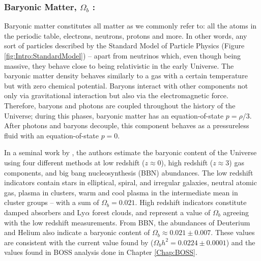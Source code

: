 \subsubsection{Baryonic Matter, $\Omega_b$ :}
Baryonic matter constitutes all matter as we commonly refer to: all the atoms in the periodic table, electrons, neutrons, protons and more. In other words, any sort of particles described by the Standard Model of Particle Physics (Figure \ref{fig:Intro:StandardModel}) -- apart from neutrinos which, even though being massive, they behave close to being relativistic in the early Universe. The baryonic matter density behaves similarly to a gas with a certain temperature but with zero chemical potential. Baryons interact with other components not only via gravitational interaction but also via the electromagnetic force. Therefore, baryons and photons are coupled throughout the history of the Universe; during this phases, baryonic matter has an equation-of-state $p = \rho/3$. After photons and baryons decouple, this component behaves as a pressureless fluid with an equation-of-state $p=0$. 

\qquad In a seminal work by \cite{1998BaryonContent}, the authors estimate the baryonic content of the Universe using four different methods at low redshift ($z \approx 0$), high redshift ($z\approx 3$) gas components, and big bang nucleosynthesis (BBN) abundances. The low redshift indicators contain stars in elliptical, spiral, and irregular galaxies, neutral atomic gas, plasma in clusters, warm and cool plasma in the intermediate mean in cluster groups -- with a sum of $\Omega_b = 0.021$. High redshift indicators constitute damped absorbers and Ly$\alpha$ forest clouds, and represent a value of $\Omega_b$ agreeing with the low redshift measurements. From BBN, the abundances of Deuterium and Helium also indicate a baryonic content of $\Omega_b \approx 0.021\pm 0.007$. These values are consistent with the current value found by \cite{2018PlanckCosmology} ($\Omega_b h^2 = 0.0224 \pm 0.0001$) and the values found in BOSS analysis done in Chapter \ref{Chap:BOSS}.

